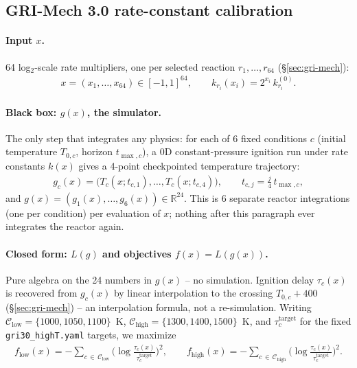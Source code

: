 \documentclass[11pt]{article}
\begin{document}
\subsection{GRI-Mech 3.0 rate-constant calibration}

\paragraph{Input $x$.} 64 log$_2$-scale rate multipliers, one per
selected reaction $r_1, \ldots, r_{64}$ (\S\ref{sec:gri-mech}):
\begin{align}
x = (x_1, \ldots, x_{64}) \in [-1,1]^{64}, \qquad
k_{r_i}(x_i) = 2^{x_i}\, k_{r_i}^{(0)}.
\end{align}

\paragraph{Black box: $g(x)$, the simulator.} The only step that
integrates any physics: for each of 6 fixed conditions $c$ (initial
temperature $T_{0,c}$, horizon $t_{\max,c}$), a 0D constant-pressure
ignition run under rate constants $k(x)$ gives a 4-point checkpointed
temperature trajectory:
\begin{align}
g_c(x) = \big(T_c(x; t_{c,1}), \ldots, T_c(x; t_{c,4})\big),
\qquad t_{c,j} = \tfrac{j}{4}\, t_{\max,c},
\end{align}
and $g(x) = (g_1(x), \ldots, g_6(x)) \in \mathbb{R}^{24}$. This is 6
separate reactor integrations (one per condition) per evaluation of
$x$; nothing after this paragraph ever integrates the reactor again.

\paragraph{Closed form: $L(g)$ and objectives $f(x) = L(g(x))$.} Pure
algebra on the 24 numbers in $g(x)$ -- no simulation. Ignition delay
$\tau_c(x)$ is recovered from $g_c(x)$ by linear interpolation to the
crossing $T_{0,c}+400$ (\S\ref{sec:gri-mech}) -- an interpolation
formula, not a re-simulation. Writing
$\mathcal{C}_{\mathrm{low}} = \{1000,1050,1100\}$~K,
$\mathcal{C}_{\mathrm{high}} = \{1300,1400,1500\}$~K, and
$\tau_c^{\mathrm{target}}$ for the fixed \texttt{gri30\_highT.yaml}
targets, we maximize
\begin{align}
f_{\mathrm{low}}(x) = -\!\!\sum_{c \,\in\, \mathcal{C}_{\mathrm{low}}} \Big(\log \tfrac{\tau_c(x)}{\tau_c^{\mathrm{target}}}\Big)^{\!2},
\qquad
f_{\mathrm{high}}(x) = -\!\!\sum_{c \,\in\, \mathcal{C}_{\mathrm{high}}} \Big(\log \tfrac{\tau_c(x)}{\tau_c^{\mathrm{target}}}\Big)^{\!2}.
\end{align}
\end{document}
